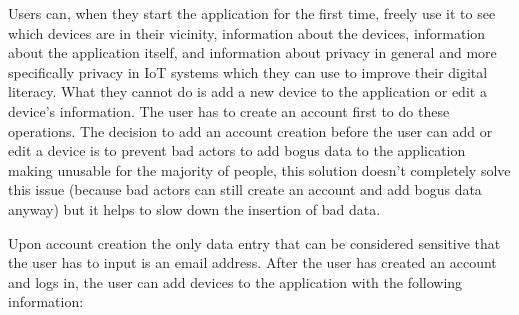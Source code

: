 Users can, when they start the application for the first time, freely use it to see
which devices are in their vicinity,
information about the devices, information about the application itself, and
information about privacy in general and more specifically privacy in IoT systems
which they can use to improve their digital literacy. What they cannot do is
add a new device to the application or edit a device's information. The user has
to create an account first to do these operations. The decision to add an
account creation before the user can add or edit a device is to prevent
bad actors to add bogus data to the application making unusable for the majority
of people, this solution doesn't completely solve this issue (because bad actors
can still create an account and add bogus data anyway) but it helps to slow
down the insertion of bad data.

Upon account creation the only data entry that can be considered sensitive that
the user has to input is an email address.
After the user has created an account and logs in, the user can add devices to the application with the following information:

